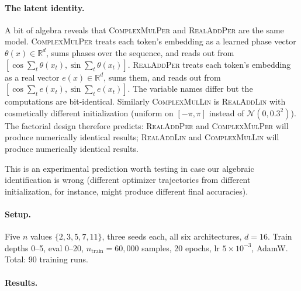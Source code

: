 \documentclass[11pt]{article}
\theoremstyle{definition}
\newcommand{\R}{\mathbb{R}}
\begin{document}
\paragraph{The latent identity.} A bit of algebra reveals that
\textsc{ComplexMulPer} and \textsc{RealAddPer} are the same model.
\textsc{ComplexMulPer} treats each token's embedding as a learned
phase vector $\theta(x) \in \R^d$, sums phases over the sequence,
and reads out from $[\cos\sum_t\theta(x_t), \sin\sum_t\theta(x_t)]$.
\textsc{RealAddPer} treats each token's embedding as a real vector
$e(x) \in \R^d$, sums them, and reads out from
$[\cos\sum_t e(x_t), \sin\sum_t e(x_t)]$. The variable names differ
but the computations are bit-identical. Similarly \textsc{ComplexMulLin}
is \textsc{RealAddLin} with cosmetically different initialization
(uniform on $[-\pi, \pi]$ instead of $\mathcal{N}(0, 0.3^2)$). The
factorial design therefore predicts: \textsc{RealAddPer} and
\textsc{ComplexMulPer} will produce numerically identical results;
\textsc{RealAddLin} and \textsc{ComplexMulLin} will produce
numerically identical results.

This is an experimental prediction worth testing in case our
algebraic identification is wrong (different optimizer trajectories
from different initialization, for instance, might produce different
final accuracies).

\paragraph{Setup.} Five $n$ values $\{2, 3, 5, 7, 11\}$, three seeds
each, all six architectures, $d=16$. Train depths 0--5, eval 0--20,
$n_\text{train} = 60{,}000$ samples, 20 epochs, lr $5\times 10^{-3}$,
AdamW. Total: 90 training runs.

\paragraph{Results.}
\end{document}
